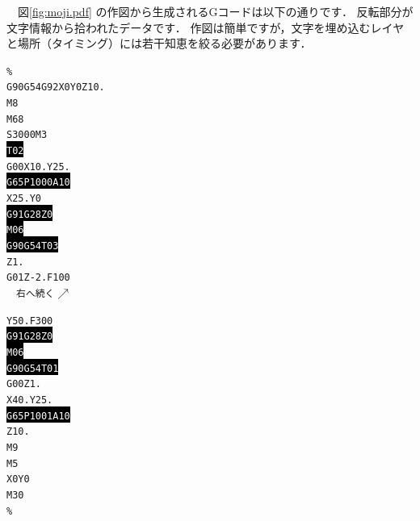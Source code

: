 　図\ref{fig:moji.pdf} の作図から生成されるGコードは以下の通りです．
反転部分が文字情報から拾われたデータです．
作図は簡単ですが，文字を埋め込むレイヤと場所（タイミング）には若干知恵を絞る必要があります．

\begin{minipage}[t]{0.5\textwidth}
\begin{screen}
{\small\texttt{\%\\[-0.5zh]
G90G54G92X0Y0Z10.\\[-0.5zh]
M8\\[-0.5zh]
M68\\[-0.5zh]
S3000M3\\[-0.5zh]
\colorbox{black}{\textcolor{white}{T02}}\\[-0.5zh]
G00X10.Y25.\\[-0.5zh]
\colorbox{black}{\textcolor{white}{G65P1000A10}}\\[-0.5zh]
X25.Y0\\[-0.5zh]
\colorbox{black}{\textcolor{white}{G91G28Z0}}\\[-0.5zh]
\colorbox{black}{\textcolor{white}{M06}}\\[-0.5zh]
\colorbox{black}{\textcolor{white}{G90G54T03}}\\[-0.5zh]
Z1.\\[-0.5zh]
G01Z-2.F100\\
　右へ続く$\nearrow$
}}
\end{screen}
\end{minipage}
\begin{minipage}[t]{0.5\textwidth}
\begin{screen}
{\small\texttt{Y50.F300\\[-0.5zh]
\colorbox{black}{\textcolor{white}{G91G28Z0}}\\[-0.5zh]
\colorbox{black}{\textcolor{white}{M06}}\\[-0.5zh]
\colorbox{black}{\textcolor{white}{G90G54T01}}\\[-0.5zh]
G00Z1.\\[-0.5zh]
X40.Y25.\\[-0.5zh]
\colorbox{black}{\textcolor{white}{G65P1001A10}}\\[-0.5zh]
Z10.\\[-0.5zh]
M9\\[-0.5zh]
M5\\[-0.5zh]
X0Y0\\[-0.5zh]
M30\\[-0.5zh]
\%
}}
\end{screen}
\end{minipage}

